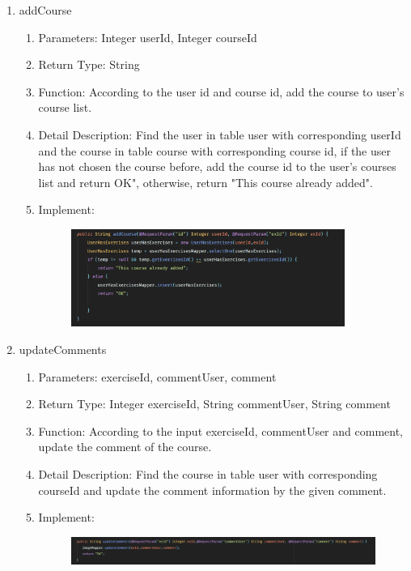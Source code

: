 \documentclass[16pt]{scrreprt}
\begin{document}
\begin{enumerate}
\begin{enumerate}
\begin{figure}[H]
\end{figure}
\end{enumerate}
	\item addCourse
	\begin{enumerate}
		\item Parameters: Integer userId, Integer courseId
		\item Return Type: String
		\item Function: According to the user id and course id, add the course to user's course list.
		\item Detail Description: Find the user in table user with corresponding userId and the course in table course with corresponding course id, if the user has not chosen the course before, add the course id to the user's courses list and return OK", otherwise, return "This course already added".
		\item Implement:
		\begin{figure}[H]
	\centering
	\includegraphics[width=0.9\textwidth]{diagrams/userAddCourse.png}\\
\end{figure}
\end{enumerate}
	\item updateComments
	\begin{enumerate}
		\item Parameters: exerciseId, commentUser, comment
		\item Return Type: Integer exerciseId, String commentUser, String comment
		\item Function: According to the input exerciseId, commentUser and comment, update the comment of the course.
		\item Detail Description: Find the course in table user with corresponding courseId and update the comment information by the given comment.
		\item Implement:
		\begin{figure}[H]
	\centering
	\includegraphics[width=1.\textwidth]{diagrams/updateComments.png}\\
\end{figure}
	\end{enumerate}
\end{enumerate}
\end{document}
